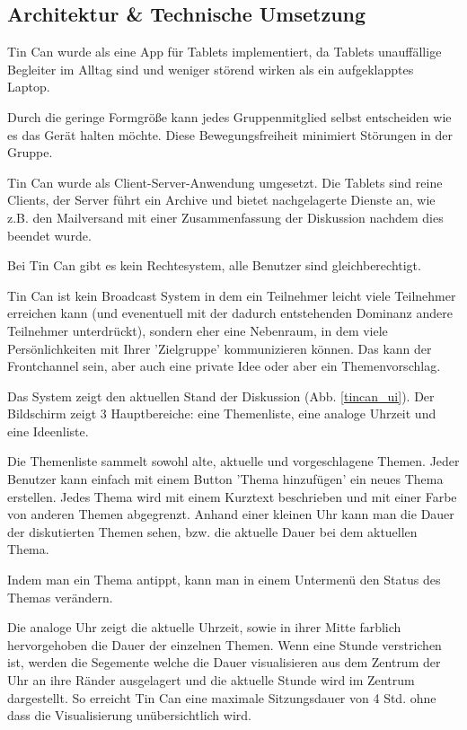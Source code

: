 \subsection{Architektur \& Technische Umsetzung}
Tin Can wurde als eine App für Tablets implementiert, da Tablets unauffällige
Begleiter im Alltag sind und weniger störend wirken als ein aufgeklapptes
Laptop.

Durch die geringe Formgröße kann jedes Gruppenmitglied selbst entscheiden wie es
das Gerät halten möchte. Diese Bewegungsfreiheit minimiert Störungen in der
Gruppe.

Tin Can wurde als Client-Server-Anwendung umgesetzt. Die Tablets sind reine
Clients, der Server führt ein Archive und bietet nachgelagerte Dienste an, wie
z.B. den Mailversand mit einer Zusammenfassung der Diskussion nachdem dies
beendet wurde.

Bei Tin Can gibt es kein Rechtesystem, alle Benutzer sind gleichberechtigt.

Tin Can ist kein Broadcast System in dem ein Teilnehmer leicht viele Teilnehmer
erreichen kann (und evenentuell mit der dadurch entstehenden Dominanz andere
Teilnehmer unterdrückt), sondern eher eine Nebenraum, in dem viele
Persönlichkeiten mit Ihrer 'Zielgruppe' kommunizieren können. Das kann der
Frontchannel sein, aber auch eine private Idee oder aber ein Themenvorschlag.

Das System zeigt den aktuellen Stand der Diskussion (Abb. \ref{tincan_ui}). Der Bildschirm zeigt 3
Hauptbereiche: eine Themenliste, eine analoge Uhrzeit und eine Ideenliste.

Die Themenliste sammelt sowohl alte, aktuelle und vorgeschlagene Themen. Jeder
Benutzer kann einfach mit einem Button 'Thema hinzufügen' ein neues Thema
erstellen. Jedes Thema wird mit einem Kurztext beschrieben und mit einer Farbe
von anderen Themen abgegrenzt. Anhand einer kleinen Uhr kann man die Dauer der
diskutierten Themen sehen, bzw. die aktuelle Dauer bei dem aktuellen Thema.

Indem man ein Thema antippt, kann man in einem Untermenü den Status des Themas
verändern.

Die analoge Uhr zeigt die aktuelle Uhrzeit, sowie in ihrer Mitte farblich
hervorgehoben die Dauer der einzelnen Themen.
Wenn eine Stunde verstrichen ist, werden die Segemente welche die Dauer
visualisieren aus dem Zentrum der Uhr an ihre Ränder ausgelagert und die
aktuelle Stunde wird im Zentrum dargestellt. So erreicht Tin Can eine maximale
Sitzungsdauer von 4 Std. ohne dass die Visualisierung unübersichtlich wird.

